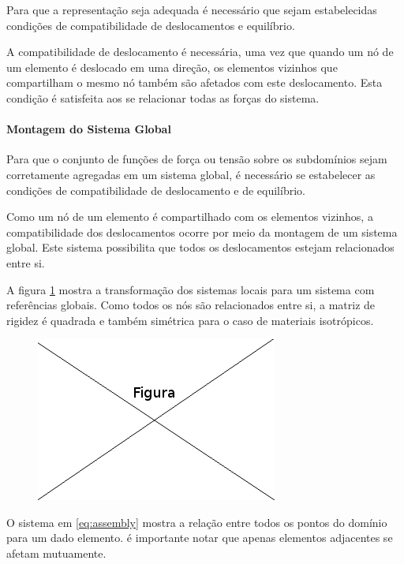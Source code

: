  Para que a representação seja adequada é necessário que sejam estabelecidas condições de compatibilidade de deslocamentos e equilíbrio.
 
 A compatibilidade de deslocamento é necessária, uma vez que quando um nó de um elemento é deslocado em uma direção, os elementos vizinhos que compartilham o mesmo nó também são afetados com este deslocamento. Esta condição é satisfeita aos se relacionar todas as forças do sistema.
 
 \paragraph{Montagem do Sistema Global}
 
 Para que o conjunto de funções de força ou tensão sobre os subdomínios sejam corretamente agregadas em um sistema global, é necessário se estabelecer as condições de compatibilidade de deslocamento e de equilíbrio.
 
 Como um nó de um elemento é compartilhado com os elementos vizinhos, a compatibilidade dos deslocamentos ocorre por meio da montagem de um sistema global. Este sistema possibilita que todos os deslocamentos estejam relacionados entre si.
 
  A figura \ref{fig:loc2glob} mostra a transformação dos sistemas locais para um sistema com referências globais. Como todos os nós são relacionados entre si, a matriz de rigidez é quadrada e também simétrica para o caso de materiais isotrópicos.
  
  \begin{figure}[!htb]
  \centering
  \includegraphics[scale=0.5]{figuras/temp.png}
  \caption{}
  \label{fig:loc2glob}
  \end{figure}
  
  O sistema em \ref{eq:assembly} mostra a relação entre todos os pontos do domínio para um dado elemento. é importante notar que apenas elementos adjacentes se afetam mutuamente.
  

